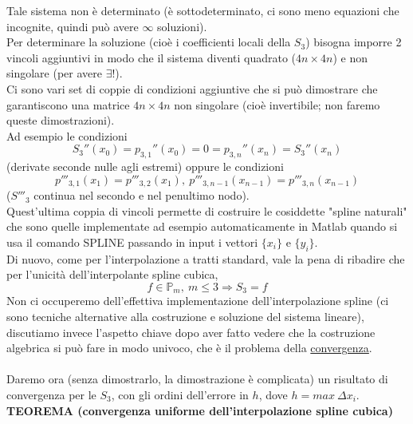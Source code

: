 \documentclass[12pt,a4paper]{article}
\begin{document}
Tale sistema non è determinato (è sottodeterminato, ci sono meno equazioni che incognite, quindi può avere $\infty$ soluzioni).\\
Per determinare la soluzione (cioè i coefficienti locali della $S_3$) bisogna imporre 2 vincoli aggiuntivi in modo che il sistema diventi quadrato ($4n \times 4n$) e non singolare (per avere $\exists!$).\\
Ci sono vari set di coppie di condizioni  aggiuntive che si può dimostrare che garantiscono una matrice $4n \times 4n$ non singolare (cioè invertibile; non faremo queste dimostrazioni).\\
Ad esempio le condizioni 
\begin{equation*}
    S_3''(x_0)=p_{3,1}''(x_0)=0=p_{3,n}''(x_n)=S_3''(x_n)
\end{equation*}
(derivate seconde nulle agli estremi) oppure le condizioni
\[
p'''_{3,1}(x_1) = p'''_{3,2}(x_1), \ p'''_{3,n-1}(x_{n-1}) = p'''_{3,n} (x_{n-1})
\]
($S'''_3$ continua nel secondo e nel penultimo nodo).\\
Quest'ultima coppia di vincoli permette di costruire le cosiddette "spline naturali" che sono quelle implementate ad esempio automaticamente in Matlab quando si usa il comando SPLINE passando in input i vettori $\{x_i \}$ e $\{ y_i \}$.\\
Di nuovo, come per l'interpolazione a tratti standard, vale la pena di ribadire che per l'unicità dell'interpolante spline cubica,
\[
f \in \mathbb{P}_m, \ m \leq 3 \Rightarrow S_3 = f
\]
Non ci occuperemo dell'effettiva implementazione dell'interpolazione spline (ci sono tecniche alternative alla costruzione e soluzione del sistema lineare), discutiamo invece l'aspetto chiave dopo aver fatto vedere che la costruzione algebrica si può fare in modo univoco, che è il problema della \underline{convergenza}.\\\\
Daremo ora (senza dimostrarlo, la dimostrazione è complicata) un risultato di convergenza per le $S_3$, con gli ordini dell'errore in $h$, dove $h = max \ \Delta x_i$.\\
\textbf{TEOREMA (convergenza uniforme dell'interpolazione spline cubica)}\\
\begin{center}
\end{center}
\end{document}
